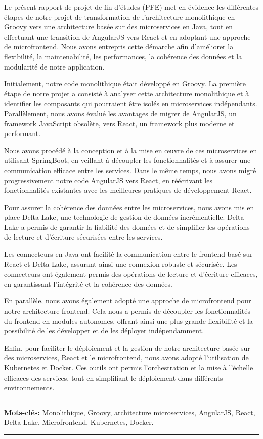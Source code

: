 \resume

Le présent rapport de projet de fin d'études (PFE) met en évidence les différentes étapes de notre projet de transformation de l'architecture monolithique en Groovy vers une architecture basée sur des microservices en Java, tout en effectuant une transition de AngularJS vers React et en adoptant une approche de microfrontend. Nous avons entrepris cette démarche afin d'améliorer la flexibilité, la maintenabilité, les performances, la cohérence des données et la modularité de notre application.
\medskip

Initialement, notre code monolithique était développé en Groovy. La première étape de notre projet a consisté à analyser cette architecture monolithique et à identifier les composants qui pourraient être isolés en microservices indépendants. Parallèlement, nous avons évalué les avantages de migrer de AngularJS, un framework JavaScript obsolète, vers React, un framework plus moderne et performant.

\medskip
Nous avons procédé à la conception et à la mise en œuvre de ces microservices en utilisant SpringBoot, en veillant à découpler les fonctionnalités et à assurer une communication efficace entre les services. Dans le même temps, nous avons migré progressivement notre code AngularJS vers React, en réécrivant les fonctionnalités existantes avec les meilleures pratiques de développement React.
\medskip

Pour assurer la cohérence des données entre les microservices, nous avons mis en place Delta Lake, une technologie de gestion de données incrémentielle. Delta Lake a permis de garantir la fiabilité des données et de simplifier les opérations de lecture et d'écriture sécurisées entre les services.

\medskip
Les connecteurs en Java ont facilité la communication entre le frontend basé sur React et Delta Lake, assurant ainsi une connexion robuste et sécurisée. Les connecteurs ont également permis des opérations de lecture et d'écriture efficaces, en garantissant l'intégrité et la cohérence des données.

\medskip
 
En parallèle, nous avons également adopté une approche de microfrontend pour notre architecture frontend. Cela nous a permis de découpler les fonctionnalités du frontend en modules autonomes, offrant ainsi une plus grande flexibilité et la possibilité de les développer et de les déployer indépendamment.
\medskip

Enfin, pour faciliter le déploiement et la gestion de notre architecture basée sur des microservices, React et le microfrontend, nous avons adopté l'utilisation de Kubernetes et Docker. Ces outils ont permis l'orchestration et la mise à l'échelle efficaces des services, tout en simplifiant le déploiement dans différents environnements.

\noindent\rule[2pt]{\textwidth}{0.5pt}
{\textbf{Mots-clés:}}
Monolithique, Groovy, architecture microservices, AngularJS, React, Delta Lake, Microfrontend, Kubernetes, Docker.
\\
\noindent\rule[2pt]{\textwidth}{0.5pt}

\clearpage

